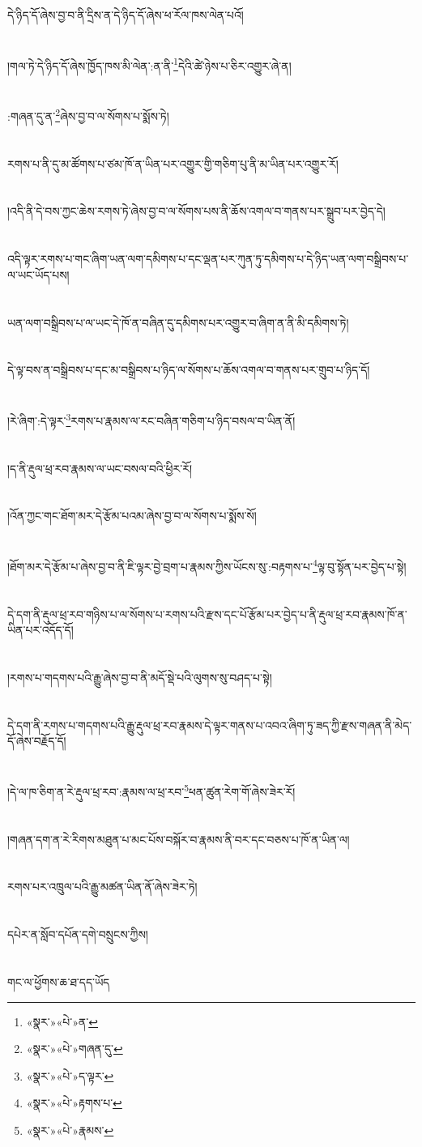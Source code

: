དེ་ཉིད་དོ་ཞེས་བྱ་བ་ནི་དྲིས་ན་དེ་ཉིད་དོ་ཞེས་ཕ་རོལ་ཁས་ལེན་པའོ།\chapter{ }།གལ་ཏེ་དེ་ཉིད་དོ་ཞེས་ཁྱོད་ཁས་མི་ལེན་:ན་ནི་\footnote{«སྣར་»«པེ་»ན་}དེའི་ཚེ་ཉེས་པ་ཅིར་འགྱུར་ཞེ་ན།\chapter{ }:གཞན་དུ་ན་\footnote{«སྣར་»«པེ་»གཞན་དུ་}ཞེས་བྱ་བ་ལ་སོགས་པ་སྨོས་ཏེ།\chapter{ }རགས་པ་ནི་དུ་མ་ཚོགས་པ་ཙམ་ཁོ་ན་ཡིན་པར་འགྱུར་གྱི་གཅིག་པུ་ནི་མ་ཡིན་པར་འགྱུར་རོ།\chapter{ }།འདི་ནི་དེ་བས་ཀྱང་ཆེས་རགས་ཏེ་ཞེས་བྱ་བ་ལ་སོགས་པས་ནི་ཆོས་འགལ་བ་གནས་པར་སྒྲུབ་པར་བྱེད་དེ།\chapter{ }འདི་ལྟར་རགས་པ་གང་ཞིག་ཡན་ལག་དམིགས་པ་དང་ལྡན་པར་ཀུན་ཏུ་དམིགས་པ་དེ་ཉིད་ཡན་ལག་བསྒྲིབས་པ་ལ་ཡང་ཡོད་པས།\chapter{ }ཡན་ལག་བསྒྲིབས་པ་ལ་ཡང་དེ་ཁོ་ན་བཞིན་དུ་དམིགས་པར་འགྱུར་བ་ཞིག་ན་ནི་མི་དམིགས་ཏེ།\chapter{ }དེ་ལྟ་བས་ན་བསྒྲིབས་པ་དང་མ་བསྒྲིབས་པ་ཉིད་ལ་སོགས་པ་ཆོས་འགལ་བ་གནས་པར་གྲུབ་པ་ཉིད་དོ།\chapter{ }།རེ་ཞིག་:དེ་ལྟར་\footnote{«སྣར་»«པེ་»ད་ལྟར་}རགས་པ་རྣམས་ལ་རང་བཞིན་གཅིག་པ་ཉིད་བསལ་བ་ཡིན་ནོ།\chapter{ }།ད་ནི་རྡུལ་ཕྲ་རབ་རྣམས་ལ་ཡང་བསལ་བའི་ཕྱིར་རོ།\chapter{ }།འོན་ཀྱང་གང་ཐོག་མར་དེ་རྩོམ་པའམ་ཞེས་བྱ་བ་ལ་སོགས་པ་སྨོས་སོ།\chapter{ }།ཐོག་མར་དེ་རྩོམ་པ་ཞེས་བྱ་བ་ནི་ཇི་ལྟར་བྱེ་བྲག་པ་རྣམས་ཀྱིས་ཡོངས་སུ་:བརྟགས་པ་\footnote{«སྣར་»«པེ་»རྟགས་པ་}ལྟ་བུ་སྟོན་པར་བྱེད་པ་སྟེ།\chapter{ }དེ་དག་ནི་རྡུལ་ཕྲ་རབ་གཉིས་པ་ལ་སོགས་པ་རགས་པའི་རྫས་དང་པོ་རྩོམ་པར་བྱེད་པ་ནི་རྡུལ་ཕྲ་རབ་རྣམས་ཁོ་ན་ཡིན་པར་འདོད་དོ།\chapter{ }།རགས་པ་གདགས་པའི་རྒྱུ་ཞེས་བྱ་བ་ནི་མདོ་སྡེ་པའི་ལུགས་སུ་བཤད་པ་སྟེ།\chapter{ }དེ་དག་ནི་རགས་པ་གདགས་པའི་རྒྱུ་རྡུལ་ཕྲ་རབ་རྣམས་དེ་ལྟར་གནས་པ་འབའ་ཞིག་ཏུ་ཟད་ཀྱི་རྫས་གཞན་ནི་མེད་དོ་ཞེས་བརྗོད་དོ།\chapter{ }།དེ་ལ་ཁ་ཅིག་ན་རེ་རྡུལ་ཕྲ་རབ་:རྣམས་ལ་ཕྲ་རབ་\footnote{«སྣར་»«པེ་»རྣམས་}ཕན་ཚུན་རེག་གོ་ཞེས་ཟེར་རོ།\chapter{ }།གཞན་དག་ན་རེ་རིགས་མཐུན་པ་མང་པོས་བསྐོར་བ་རྣམས་ནི་བར་དང་བཅས་པ་ཁོ་ན་ཡིན་ལ།\chapter{ }རགས་པར་འཁྲུལ་པའི་རྒྱུ་མཚན་ཡིན་ནོ་ཞེས་ཟེར་ཏེ།\chapter{ }དཔེར་ན་སློབ་དཔོན་དགེ་བསྲུངས་ཀྱིས།\chapter{ }གང་ལ་ཕྱོགས་ཆ་ཐ་དད་ཡོད།\c